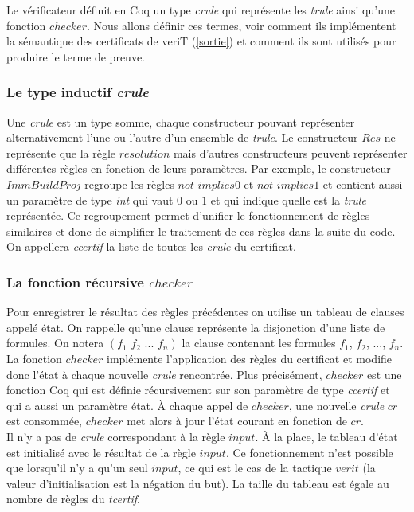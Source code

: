 \documentclass[11pt]{article}
\begin{document}
Le vérificateur définit en Coq un type \textit{crule} qui représente les \textit{trule} ainsi qu'une fonction $checker$. Nous allons définir ces termes, voir comment ils implémentent la sémantique des certificats de veriT (\ref{sortie}) et comment ils sont utilisés pour produire le terme de preuve.


\subsubsection{Le type inductif \textit{crule}}\label{regroupement}

Une \textit{crule} est un type somme, chaque constructeur pouvant représenter alternativement l'une ou l'autre d'un ensemble de \textit{trule}. Le constructeur $Res$ ne représente que la règle $resolution$ mais d'autres constructeurs peuvent représenter différentes règles en fonction de leurs paramètres. Par exemple, le constructeur $ImmBuildProj$ regroupe les règles $not\_implies0$ et $not\_implies1$ et contient aussi un paramètre de type \textit{int} qui vaut $0$ ou $1$ et qui indique quelle est la \textit{trule} représentée. Ce regroupement permet d'unifier le fonctionnement de règles similaires et donc de simplifier le traitement de ces règles dans la suite du code. \\

On appellera \textit{ccertif} la liste de toutes les \textit{crule} du certificat.


\subsubsection{La fonction récursive $checker$} \label{checker}

Pour enregistrer le résultat des règles précédentes on utilise un tableau de clauses appelé état. On rappelle qu'une clause représente la disjonction d'une liste de formules. On notera $(f_1 \,\, f_2\,\,  ... \,\, f_n)$ la clause contenant les formules $f_1$, $f_2$, ..., $f_n$. La fonction $checker$ implémente l'application des règles du certificat et modifie donc l'état à chaque nouvelle \textit{crule} rencontrée. Plus précisément, $checker$ est une fonction Coq qui est définie récursivement sur son paramètre de type \textit{ccertif} et qui a aussi un paramètre état. À chaque appel de $checker$, une nouvelle \textit{crule} $cr$ est consommée, $checker$ met alors à jour l'état courant en fonction de $cr$.\\

Il n'y a pas de \textit{crule} correspondant à la règle $input$. À la place, le tableau d'état est initialisé avec le résultat de la règle $input$. Ce fonctionnement n'est possible que lorsqu'il n'y a qu'un seul $input$, ce qui est le cas de la tactique $verit$ (la valeur d'initialisation est la négation du but). La taille du tableau est égale au nombre de règles du \textit{tcertif}. \\
\end{document}
